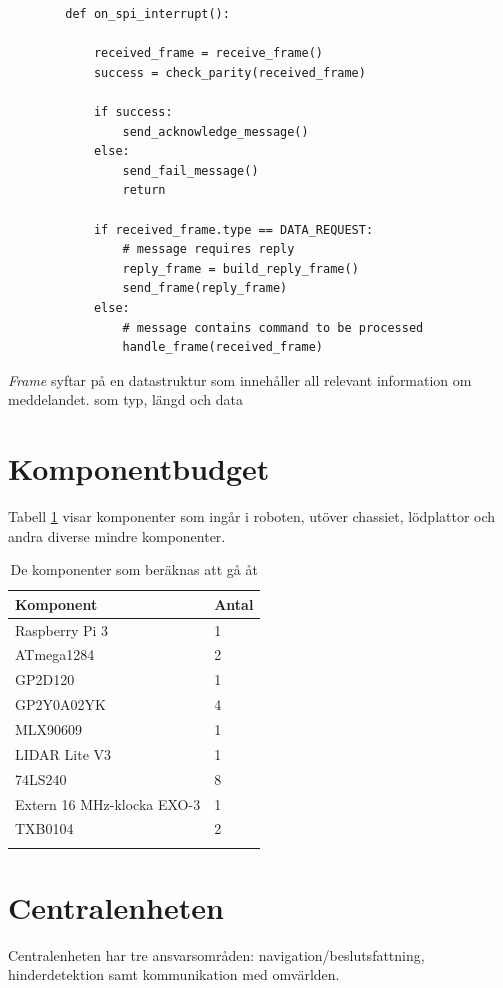 \documentclass[a4paper,titlepage,12pt]{article}
\begin{document}
	\begin{lstlisting}
        def on_spi_interrupt():
			
            received_frame = receive_frame()
            success = check_parity(received_frame)

            if success:
                send_acknowledge_message()
            else:
                send_fail_message()
                return

            if received_frame.type == DATA_REQUEST:
                # message requires reply
                reply_frame = build_reply_frame()
                send_frame(reply_frame)
            else:
                # message contains command to be processed
                handle_frame(received_frame)

	\end{lstlisting}
    \textit{Frame} syftar på en datastruktur som innehåller all relevant
    information om meddelandet. som typ, längd och data

	\section{Komponentbudget}

    Tabell \ref{table:components} visar komponenter som ingår i
    roboten, utöver chassiet, lödplattor och andra diverse
    mindre komponenter.

	\begin{longtable}[c]{l l}
		\textbf{Komponent} & \textbf{Antal} \\ \midrule
		Raspberry Pi 3 & 1 \\
		ATmega1284 & 2 \\
		GP2D120 & 1 \\
		GP2Y0A02YK & 4 \\
		MLX90609 & 1 \\
		LIDAR Lite V3 & 1 \\
	    74LS240 & 8 \\
        Extern 16 MHz-klocka EXO-3 & 1 \\
        TXB0104 & 2 \\
        \caption{De komponenter som beräknas att gå åt \label{table:components}}
	\end{longtable}
	
    \newpage
	\section{Centralenheten}
	Centralenheten har tre ansvarsområden: navigation/beslutsfattning, hinderdetektion samt
	kommunikation med omvärlden.
\end{document}

